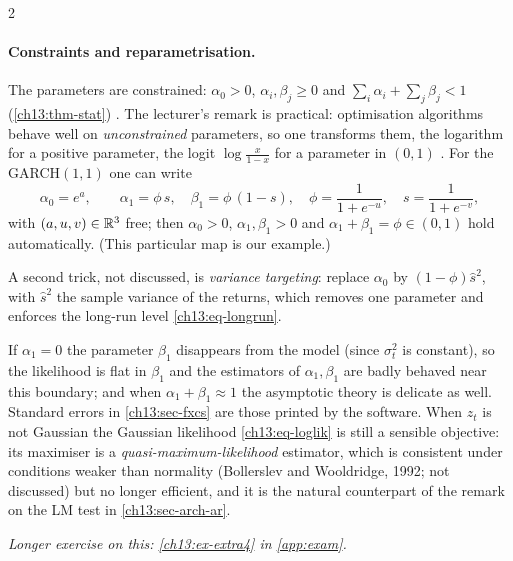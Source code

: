 \begin{paracol}{2}
\paragraph{Constraints and reparametrisation.} The parameters are constrained: $\alpha_0>0$, $\alpha_i,\beta_j\ge0$ and $\sum_i\alpha_i+\sum_j\beta_j<1$ (\cref{ch13:thm-stat}) . The lecturer's
remark is practical: optimisation algorithms behave well on \emph{unconstrained} parameters, so one transforms them, the logarithm for a positive parameter, the logit
$\log\frac x{1-x}$ for a parameter in $(0,1)$ . For the GARCH$(1,1)$ one can write
\[
  \alpha_0=e^{a},\qquad \alpha_1=\phi\,s,\quad\beta_1=\phi\,(1-s),\quad \phi=\frac1{1+e^{-u}},\quad s=\frac1{1+e^{-v}},
\]
with $(a,u,v)\in\mathbb{R}^3$ free; then $\alpha_0>0$, $\alpha_1,\beta_1>0$ and $\alpha_1+\beta_1=\phi\in(0,1)$ hold automatically. (This particular map is our example.)
\begin{secondary}
A second trick, not discussed, is \emph{variance targeting}:
replace $\alpha_0$ by $(1-\phi)\hat s^2$, with $\hat s^2$ the sample variance of the returns, which removes one parameter and enforces the long-run level \eqref{ch13:eq-longrun}.
\end{secondary}

\begin{remark}\label{ch13:rem-ident}
If $\alpha_1=0$ the parameter $\beta_1$ disappears from the model (since $\sigma_t^2$ is constant), so the likelihood is flat in $\beta_1$ and the estimators of $\alpha_1,\beta_1$ are badly behaved near this boundary; and when $\alpha_1+\beta_1\approx1$ the
asymptotic theory is delicate as well. Standard errors in \cref{ch13:sec-fxcs} are those printed by the software. When $z_t$ is not Gaussian the Gaussian likelihood \eqref{ch13:eq-loglik} is still a sensible objective: its maximiser is a
\emph{quasi-maximum-likelihood} estimator, which is consistent under conditions weaker than normality (Bollerslev and Wooldridge, 1992; not discussed) but no longer efficient, and it is the natural counterpart of
the remark on the LM test in \cref{ch13:sec-arch-ar}.
\end{remark}

\noindent\emph{Longer exercise on this: \cref{ch13:ex-extra4} in \cref{app:exam}.}


\end{paracol}
